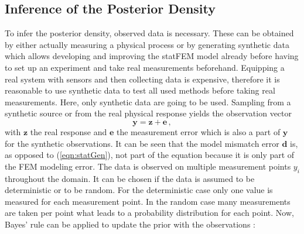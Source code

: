 \documentclass[%
  a4paper,oneside,%
  11pt,%
  smallchapters,
  style=printdev,
  extramargin,
  green,%
  rgb, <cmyk>
  ]{tubsbook}
\begin{document}
\subsection{Inference of the Posterior Density}
To infer the posterior density, observed data is necessary. These can be obtained by either actually measuring a physical process or by generating synthetic data which allows developing and improving the statFEM model already before having to set up an experiment and take real measurements beforehand. Equipping a real system with sensors and then collecting data is expensive, therefore it is reasonable to use synthetic data to test all used methods before taking real measurements. Here, only synthetic data are going to be used.
%
Sampling from a synthetic source or from the real physical response yields the observation vector
%
\begin{equation}
\bm{y} = \bm{z} + \bm{e} \, ,
\end{equation}
%
with $\bm{z}$ the real response and $\bm{e}$ the measurement error which is also a part of $\bm{y}$ for the synthetic observations. It can be seen that the model mismatch error $\bm{d}$ is, as opposed to (\ref{eqn:statGen}), not part of the equation because it is only part of the FEM modeling error. 
%
The data is observed on multiple measurement points $y_i$ throughout the domain. It can be chosen if the data is assumed to be deterministic or to be random. For the deterministic case only one value is measured for each measurement point. In the random case many measurements are taken per point what leads to a probability distribution for each point.
%
Now, Bayes' rule can be applied to update the prior with the observations \cite{girolami2021}: 
\end{document}
